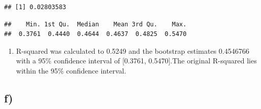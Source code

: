 \documentclass[
]{article}
\newenvironment{Shaded}{\begin{snugshade}}{\end{snugshade}}
\newcommand{\CommentTok}[1]{\textcolor[rgb]{0.56,0.35,0.01}{\textit{#1}}}
\newcommand{\DecValTok}[1]{\textcolor[rgb]{0.00,0.00,0.81}{#1}}
\newcommand{\FunctionTok}[1]{\textcolor[rgb]{0.00,0.00,0.00}{#1}}
\newcommand{\NormalTok}[1]{#1}
\newcommand{\OtherTok}[1]{\textcolor[rgb]{0.56,0.35,0.01}{#1}}
\newcommand{\SpecialCharTok}[1]{\textcolor[rgb]{0.00,0.00,0.00}{#1}}
\providecommand{\tightlist}{%
  \setlength{\itemsep}{0pt}\setlength{\parskip}{0pt}}
\begin{document}
\begin{Shaded}
\end{Shaded}

\begin{verbatim}
## [1] 0.02803583
\end{verbatim}

\begin{Shaded}
\end{Shaded}

\begin{verbatim}
##    Min. 1st Qu.  Median    Mean 3rd Qu.    Max. 
##  0.3761  0.4440  0.4644  0.4637  0.4825  0.5470
\end{verbatim}

\begin{enumerate}
\def\labelenumi{(\roman{enumi})}
\setcounter{enumi}{3}
\tightlist
\item
  R-squared was calculated to 0.5249 and the bootstrap estimates
  0.4546766 with a 95\% confidence interval of {[}0.3761, 0.5470{]}.The
  original R-squared lies within the 95\% confidence interval.
\end{enumerate}

\hypertarget{f-1}{%
\subsection{f)}\label{f-1}}
\end{document}
